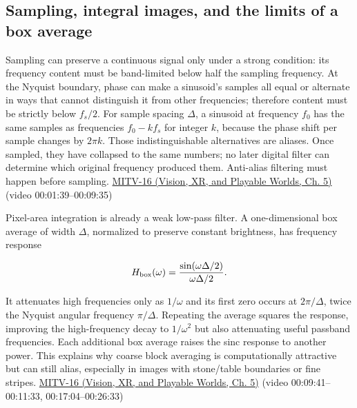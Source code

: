 \subsection{Sampling, integral images, and the limits of a box average}\label{03-visual-computing-i-ch004-sampling-integral-images-and-the-limits-of-a-box-average}

\hypertarget{03-visual-computing-i-ch004-sampling-integral-images-and-the-limits-of-a-box-average}{}

Sampling can preserve a continuous signal only under a strong condition: its frequency content must be band-limited below half the sampling frequency. At the Nyquist boundary, phase can make a sinusoid's samples all equal or alternate in ways that cannot distinguish it from other frequencies; therefore content must be strictly below \(f_s/2\). For sample spacing \(\Delta\), a sinusoid at frequency \(f_0\) has the same samples as frequencies \(f_0-kf_s\) for integer \(k\), because the phase shift per sample changes by \(2\pi k\). Those indistinguishable alternatives are aliases. Once sampled, they have collapsed to the same numbers; no later digital filter can determine which original frequency produced them. Anti-alias filtering must happen before sampling. \href{../07-Vision-XR-and-Playable-Worlds/main.pdf\#nameddest=04-visual-computing-ii-ch036-mitv-16---fast-convolution-low-pass-filter-approximations-integral-images-us-6457032}{MITV-16 (Vision, XR, and Playable Worlds, Ch. 5)} (video 00:01:39--00:09:35)

Pixel-area integration is already a weak low-pass filter. A one-dimensional box average of width \(\Delta\), normalized to preserve constant brightness, has frequency response

\[
H_{\rm box}(\omega)=\frac{\sin(\omega\Delta/2)}{\omega\Delta/2}.
\]

It attenuates high frequencies only as \(1/\omega\) and its first zero occurs at \(2\pi/\Delta\), twice the Nyquist angular frequency \(\pi/\Delta\). Repeating the average squares the response, improving the high-frequency decay to \(1/\omega^2\) but also attenuating useful passband frequencies. Each additional box average raises the sinc response to another power. This explains why coarse block averaging is computationally attractive but can still alias, especially in images with stone/table boundaries or fine stripes. \href{../07-Vision-XR-and-Playable-Worlds/main.pdf\#nameddest=04-visual-computing-ii-ch036-mitv-16---fast-convolution-low-pass-filter-approximations-integral-images-us-6457032}{MITV-16 (Vision, XR, and Playable Worlds, Ch. 5)} (video 00:09:41--00:11:33, 00:17:04--00:26:33)

